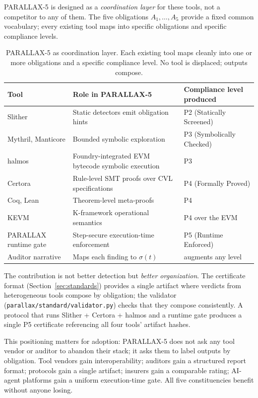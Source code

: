 \documentclass[11pt,a4paper]{article}
\begin{document}
PARALLAX-5 is designed as a \emph{coordination layer} for these tools, not a competitor to any of them. The five obligations $A_1, \ldots, A_5$ provide a fixed common vocabulary; every existing tool maps into specific obligations and specific compliance levels.

\begin{table}[h]
\centering
\small
\begin{tabular}{lll}
\toprule
Tool & Role in PARALLAX-5 & Compliance level produced \\
\midrule
Slither & Static detectors emit obligation hints & P2 (Statically Screened) \\
Mythril, Manticore & Bounded symbolic exploration & P3 (Symbolically Checked) \\
halmos & Foundry-integrated EVM bytecode symbolic execution & P3 \\
Certora & Rule-level SMT proofs over CVL specifications & P4 (Formally Proved) \\
Coq, Lean & Theorem-level meta-proofs & P4 \\
KEVM~\cite{kevm} & K-framework operational semantics & P4 over the EVM \\
PARALLAX runtime gate & Step-secure execution-time enforcement & P5 (Runtime Enforced) \\
Auditor narrative & Maps each finding to $\sigma(t)$ & augments any level \\
\bottomrule
\end{tabular}
\caption{PARALLAX-5 as coordination layer. Each existing tool maps cleanly into one or more obligations and a specific compliance level. No tool is displaced; outputs compose.}\label{tab:tool-coordination}
\end{table}

The contribution is not better detection but \emph{better organization}. The certificate format (Section~\ref{sec:standards}) provides a single artifact where verdicts from heterogeneous tools compose by obligation; the validator (\texttt{parallax/standard/validator.py}) checks that they compose consistently. A protocol that runs Slither + Certora + halmos and a runtime gate produces a single P5 certificate referencing all four tools' artifact hashes.

This positioning matters for adoption: PARALLAX-5 does not ask any tool vendor or auditor to abandon their stack; it asks them to label outputs by obligation. Tool vendors gain interoperability; auditors gain a structured report format; protocols gain a single artifact; insurers gain a comparable rating; AI-agent platforms gain a uniform execution-time gate. All five constituencies benefit without anyone losing.
\end{document}
